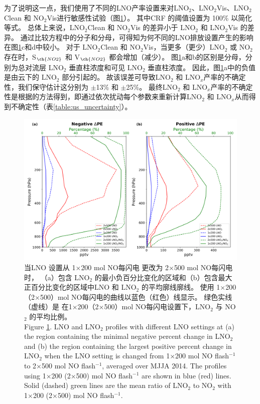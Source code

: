 为了说明这一点，我们使用了不同的LNO产率设置来对LNO$_2$、LNO$_2$Vis、LNO$_2$Clean 和 NO$_2$Vis进行敏感性试验（图\ref{fig:us_lno2_profile}）。
其中CRF 的阈值设置为 100\% 以简化等式。
总体上来说，LNO$_2$Clean 和 NO$_2$Vis 的差异小于 LNO$_2$ 和 LNO$_2$Vis 的差异。
通过比较方程中的分子和分母，可得知为何不同的LNO排放设置产生的影响在图\ref{fig:us_lno2_profile}c和d中较小。
对于 LNO$_2$Clean 和 NO$_2$Vis，当更多（更少）LNO$_2$ 或 NO$_2$ 存在时，S$_{\ch{NO2}}$ 和 V$_{\ch{NO2}}$ 都会增加（减少）。
图\ref{fig:us_lno2_profile}a和b的区别是分母，分别为总对流层 LNO$_2$ 垂直柱浓度和可见 LNO$_2$ 垂直柱浓度。
因此，图\ref{fig:us_lno2_profile}a中的负值是由云下的 LNO$_2$ 部分引起的。
故该误差可导致LNO$_2$ 和 LNO$_x$产率的不确定性，我们保守估计这分别为 $\pm$13\% 和 $\pm$25\%。
最终LNO$_2$ 和 LNO$_x$产率的不确定性是根据\citet{Pickering.2016,Allen.2019,Bucsela.2019,Lapierre.2020}的方法得到，即通过依次扰动每个参数来重新计算LNO$_2$ 和 LNO$_x$从而得到不确定性（表\ref{table:us_uncertainty}）。


\begin{figure}[!htbp]
\centering
\includegraphics[width=13cm]{./figures/us_lno2_profile.png}
\caption{当LNO 设置从 1$\times$200 mol NO每闪电 更改为 2$\times$500 mol NO每闪电 时，
（a）包含 LNO$_2$ 的最小负百分比变化的区域和（b）包含最大正百分比变化的区域中LNO 和 LNO$_2$ 的平均廓线廓线。
使用 1$\times$200（2$\times$500）mol NO每闪电的曲线以蓝色（红色）线显示。
绿色实线（虚线）是 在1$\times$200（2$\times$500）mol NO每闪电设置下，LNO$_2$ 与 NO$_2$ 的平均比例。\\
Figure \ref{fig:us_lno2_profile}. LNO and LNO$_2$ profiles with different LNO settings at (a) the region containing the minimal negative percent change in LNO$_2$ and (b) the region containing the largest positive percent change in LNO$_2$ when the LNO setting is changed from 1$\times$200 mol NO flash$^{-1}$ to 2$\times$500 mol NO flash$^{-1}$, averaged over MJJA 2014.
The profiles using 1$\times$200 (2$\times$500) mol NO flash$^{-1}$ are shown in blue (red) lines.
Solid (dashed) green lines are the mean ratio of LNO$_2$ to NO$_2$ with 1$\times$200 (2$\times$500) mol NO flash$^{-1}$.}
\label{fig:us_lno2_profile}
\end{figure}


